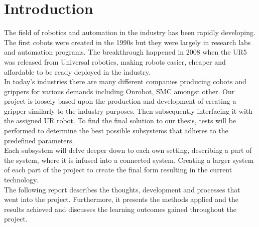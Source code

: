 \section{Introduction}
The field of robotics and automation in the industry has been rapidly developing. The first cobots were created in the 1990s but they were largely in research labs and automation programs. The breakthrough happened in 2008 when the UR5 was released from Universal robotics, making robots easier, cheaper and affordable to be ready deployed in the industry. \\

In today's industries there are many different companies producing cobots and grippers for various demands including Onrobot, SMC amongst other. Our project is loosely based upon the production and development of creating a gripper similarly to the industry purposes. Then subsequently interfacing it with the assigned UR robot. To find the final solution to our thesis, tests will be performed to determine the best possible subsystems that adheres to the predefined parameters.\\ 

Each subsystem will delve deeper down to each own setting, describing a part of the system, where it is infused into a connected system. Creating a larger system of each part of the project to create the final form resulting in the current technology. \\

The following report describes the thoughts, development and processes that went into the project. Furthermore, it presents the methods applied and the results achieved and discusses the learning outcomes gained throughout the project. \\


